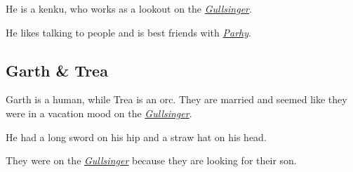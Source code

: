 \documentclass{article}
\begin{document}
\begin{multicols}{2}
    He is a kenku, who works as a lookout on the \hyperref[gullsinger]{\textit{Gullsinger}}.

    He likes talking to people and is best friends with \hyperref[parhy]{\textit{Parhy}}.

    \subsection{Garth \& Trea}
    \label{garth_trea}

    Garth is a human, while Trea is an orc. They are married and seemed like they were in a vacation mood on the \hyperref[gullsinger]{\textit{Gullsinger}}.

    He had a long sword on his hip and a straw hat on his head.

    They were on the \hyperref[gullsinger]{\textit{Gullsinger}} because they are looking for their son.


\end{multicols}
\end{document}
